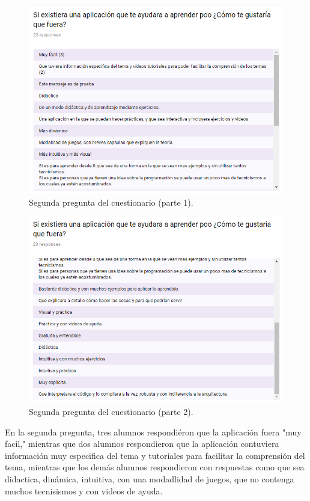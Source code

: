 \begin{figure}[H]
	\begin{center}
		\includegraphics[scale=0.6]{img/pregunta21} 
		\caption{Segunda pregunta del cuestionario (parte 1).}
		\label{p21}
	\end{center}
\end{figure}
\begin{figure}[H]
	\begin{center}
		\includegraphics[scale=0.6]{img/pregunta22} 
		\caption{Segunda pregunta del cuestionario (parte 2).}
		\label{p22}
	\end{center}
\end{figure}
En la segunda pregunta, tres alumnos respondiéron que la aplicación fuera "muy facil," mientras que dos alumnos respondieron que la aplicación contuviera información muy especifica del tema y tutoriales para facilitar la comprensión del tema, mientras que los demás alumnos respondieron con respuestas como que sea didactica, dinámica, intuitiva, con una modadlidad de juegos, que no contenga muchos tecnisismos y con videos de ayuda.

